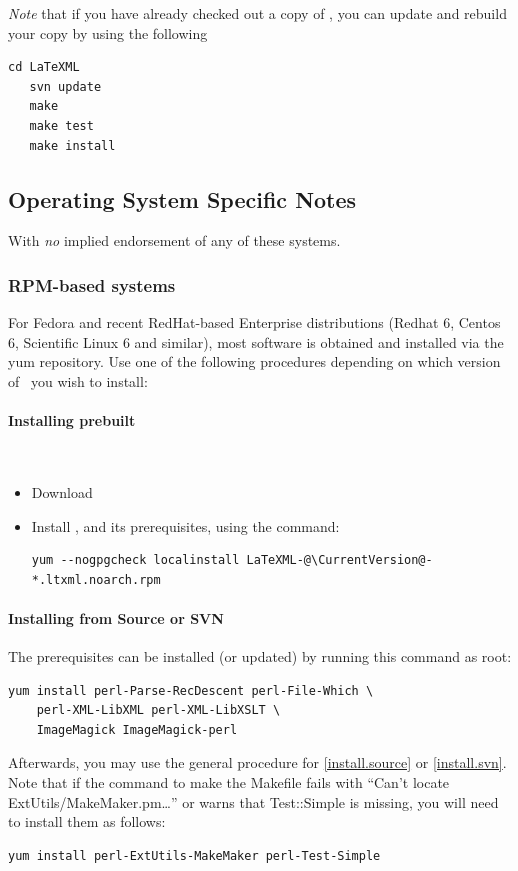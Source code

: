 \documentclass{article}
\begin{document}
\emph{Note} that if you have already checked out a copy of \LaTeXML, you can update
and rebuild your copy by using the following
\begin{lstlisting}[style=shell]
   cd LaTeXML
   svn update
   make
   make test
   make install
\end{lstlisting}

\subsection[OS-Specific Notes]{Operating System Specific Notes}\label{install.osnotes}
With \emph{no} implied endorsement of any of these systems.

\subsubsection[RPM-based systems]{RPM-based systems}\label{install.fedora}
For Fedora and recent RedHat-based Enterprise distributions
(Redhat 6, Centos 6, Scientific Linux 6 and similar),
most software is obtained and installed via the yum repository.
Use one of the following procedures depending on which version
of \LaTeXML\ you wish to install:

\paragraph{Installing prebuilt}\\
\begin{itemize}
\item Download \CurrentFedora
\item Install \LaTeXML, and its prerequisites, using the command:
\begin{lstlisting}[style=shell]
   yum --nogpgcheck localinstall LaTeXML-@\CurrentVersion@-*.ltxml.noarch.rpm
\end{lstlisting}
\end{itemize}

\paragraph{Installing from Source or SVN}
The prerequisites can be installed (or updated) by running this command as root: 
\begin{lstlisting}[style=shell]
yum install perl-Parse-RecDescent perl-File-Which \
    perl-XML-LibXML perl-XML-LibXSLT \
    ImageMagick ImageMagick-perl
\end{lstlisting}
Afterwards, you may use the general procedure for
\ref{install.source} or \ref{install.svn}.
Note that if the command to make the Makefile fails with
``Can't locate ExtUtils/MakeMaker.pm\ldots'' or warns that Test::Simple is missing,
you will need to install them as follows:
\begin{lstlisting}[style=shell]
yum install perl-ExtUtils-MakeMaker perl-Test-Simple
\end{lstlisting}
\end{document}
